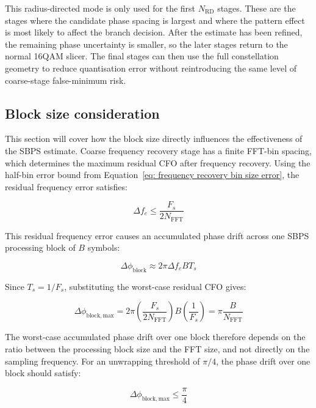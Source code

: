 This radius-directed mode is only used for the first \(N_{\mathrm{RD}}\) stages. These are the stages where the candidate phase spacing is largest and where the pattern effect is most likely to affect the branch decision. After the estimate has been refined, the remaining phase uncertainty is smaller, so the later stages return to the normal 16QAM slicer. The final stages can then use the full constellation geometry to reduce quantisation error without reintroducing the same level of coarse-stage false-minimum risk.

\subsection{Block size consideration}

This section will cover how the block size directly influences the effectiveness of the \ac{SBPS} estimate. Coarse frequency recovery stage has a finite \ac{FFT}-bin spacing, which determines the maximum residual \ac{CFO} after frequency recovery. Using the half-bin error bound from Equation~\ref{eq: frequency recovery bin size error}, the residual frequency error satisfies:

\begin{equation}
    \Delta f_e \leq \frac{F_s}{2N_{\mathrm{FFT}}}
\end{equation}

This residual frequency error causes an accumulated phase drift across one \ac{SBPS} processing block of $B$ symbols:

\begin{equation}
    \Delta \phi_{\mathrm{block}} \approx 2\pi \Delta f_e B T_s
\end{equation}

Since $T_s = 1/F_s$, substituting the worst-case residual \ac{CFO} gives:

\begin{equation}
    \Delta \phi_{\mathrm{block,max}}
    =
    2\pi
    \left(
    \frac{F_s}{2N_{\mathrm{FFT}}}
    \right)
    B
    \left(
    \frac{1}{F_s}
    \right)
    =
    \pi\frac{B}{N_{\mathrm{FFT}}}
\end{equation}

The worst-case accumulated phase drift over one block therefore depends on the ratio between the processing block size and the \ac{FFT} size, and not directly on the sampling frequency. For an unwrapping threshold of $\pi/4$, the phase drift over one block should satisfy:

\begin{equation}
    \Delta \phi_{\mathrm{block,max}} \leq \frac{\pi}{4}
\end{equation}

